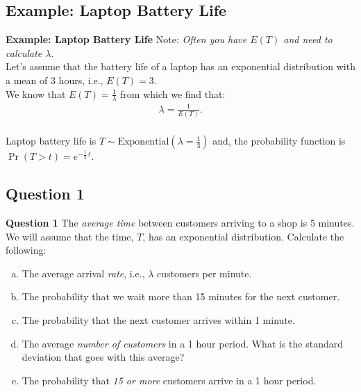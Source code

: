\documentclass[compress]{beamer}        %
\makeatletter
\newcommand{\tcb}{\textcolor{beamer@blendedblue}}
\makeatother
\begin{document}
\subsection{Example: Laptop Battery Life}
\begin{frame}{\bf \tcb{Example: Laptop Battery Life}}
Note: \emph{Often you have $E(T)$ and need to calculate $\lambda$.}\\[0.5cm]


Let's assume that the battery life of a laptop has an exponential distribution with a mean of 3 hours, i.e., $E(T) = 3$.\\[0.5cm]

We know that $E(T) = \frac{1}{\lambda}$ from which we find that:
\begin{align*}
\boxed{\lambda = \frac{1}{E(T)}}.\\
\end{align*}

Laptop battery life is $T \sim \text{Exponential}(\lambda = \frac{1}{3})$ and, the probability function is $\Pr(T > t) = e^{-\frac{1}{3}\,t}$.
\end{frame}






\subsection{Question 1}
\begin{frame}{\bf \tcb{Question 1}}
The \emph{average time} between customers arriving to a shop is 5 minutes. We will assume that the time, $T$, has an exponential distribution. Calculate the following:\\[0.2cm]
\begin{enumerate}[a)]\itemsep0.3cm
\item The average arrival \emph{rate}, i.e., $\lambda$ customers per minute.
\item The probability that we wait more than 15 minutes for the next customer.
\item The probability that the next customer arrives within 1 minute.
\item The average \emph{number of customers} in a 1 hour period. What is the standard deviation that goes with this average?
\item The probability that \emph{15 or more} customers arrive in a 1 hour period.
\end{enumerate}

\end{frame}
\end{document}
